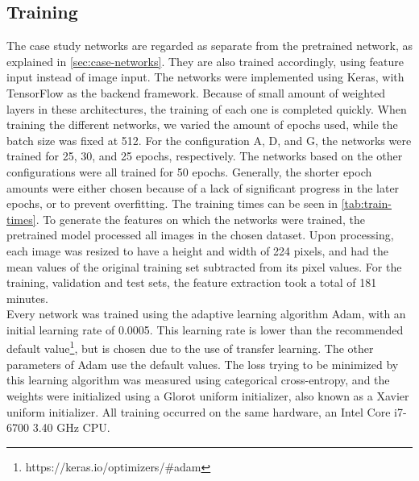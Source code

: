 \subsection{Training} \label{sec:case-training}

The case study networks are regarded as separate from the pretrained network, as explained in \autoref{sec:case-networks}. They are also trained accordingly, using feature input instead of image input. The networks were implemented using Keras, with TensorFlow as the backend framework. Because of small amount of weighted layers in these architectures, the training of each one is completed quickly. When training the different networks, we varied the amount of epochs used, while the batch size was fixed at 512. For the configuration A, D, and G, the networks were trained for 25, 30, and 25 epochs, respectively. The networks based on the other configurations were all trained for 50 epochs. Generally, the shorter epoch amounts were either chosen because of a lack of significant progress in the later epochs, or to prevent overfitting. The training times can be seen in \autoref{tab:train-times}. To generate the features on which the networks were trained, the pretrained model processed all images in the chosen dataset. Upon processing, each image was resized to have a height and width of 224 pixels, and had the mean values of the original training set subtracted from its pixel values. For the training, validation and test sets, the feature extraction took a total of 181 minutes. \\

\noindent Every network was trained using the adaptive learning algorithm Adam, with an initial learning rate of 0.0005. This learning rate is lower than the recommended default value\footnote{https://keras.io/optimizers/\#adam}, but is chosen due to the use of transfer learning. The other parameters of Adam use the default values. The loss trying to be minimized by this learning algorithm was measured using categorical cross-entropy, and the weights were initialized using a Glorot uniform initializer, also known as a Xavier uniform initializer. All training occurred on the same hardware, an Intel\textregistered{} Core\texttrademark{} i7-6700 3.40 GHz CPU. 



